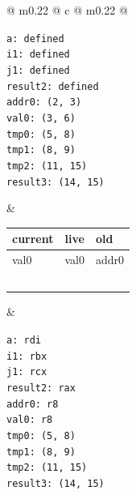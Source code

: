 \begin{figure}[H]
    \centering
    \small
    \begin{tabularx}{\textwidth}{@{} m{} @{\extracolsep{\fill}} c @{\extracolsep{\fill}} m{} @{}}
        
        \begin{tcolorbox}[
            standard jigsaw, opacityback=0, 
            colframe=black, arc=4mm, 
            width=\linewidth,
            height=6.2cm, 
            valign=center, 
            left=2pt, right=2pt
        ]
            \texttt{\small a: defined \\ i1: defined \\ j1: defined \\ result2: defined \\ addr0: (2, 3) \\ val0: (3, 6) \\ tmp0: (5, 8) \\ tmp1: (8, 9) \\ tmp2: (11, 15) \\ result3: (14, 15)}
        \end{tcolorbox} 
        & 
        \renewcommand{\arraystretch}{1.3}
        \begin{tabular}{|p{2cm}|p{2cm}|p{2cm}|}
            \hline
            \textbf{current} & \textbf{live} & \textbf{old} \\ \hline
             val0   & val0  & addr0 \\ \hline
                    &       &       \\ \hline
                    &       &       \\ \hline
                    &       &       \\ \hline
                    &       &       \\ \hline
            & & \\ \hline
        \end{tabular} 
        & 
        \begin{tcolorbox}[
            standard jigsaw, opacityback=0, 
            colframe=black, arc=4mm, 
            width=\linewidth,
            height=6.2cm, 
            valign=center,
            left=2pt, right=2pt
        ]
            \texttt{\small a: rdi \\ i1: rbx \\ j1: rcx \\ result2: rax \\ addr0: r8 \\ val0: r8 \\ tmp0: (5, 8) \\ tmp1: (8, 9) \\ tmp2: (11, 15) \\ result3: (14, 15)}

        \end{tcolorbox} \\
    \end{tabularx}
\end{figure}


